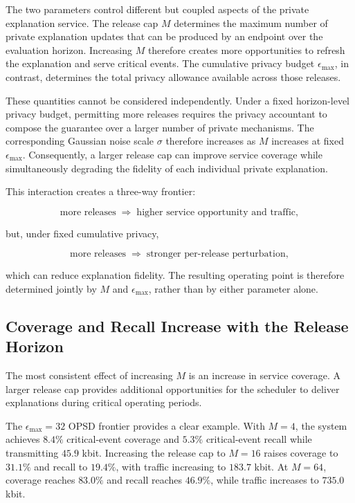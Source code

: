 \documentclass[11pt]{article}
\begin{document}
The two parameters control different but coupled aspects of the private explanation service. The release cap \(M\) determines the maximum number of private explanation updates that can be produced by an endpoint over the evaluation horizon. Increasing \(M\) therefore creates more opportunities to refresh the explanation and serve critical events. The cumulative privacy budget \(\epsilon_{\max}\), in contrast, determines the total privacy allowance available across those releases.

These quantities cannot be considered independently. Under a fixed horizon-level privacy budget, permitting more releases requires the privacy accountant to compose the guarantee over a larger number of private mechanisms. The corresponding Gaussian noise scale \(\sigma\) therefore increases as \(M\) increases at fixed \(\epsilon_{\max}\). Consequently, a larger release cap can improve service coverage while simultaneously degrading the fidelity of each individual private explanation.

This interaction creates a three-way frontier:

$$
\text{more releases}
\;\Longrightarrow\;
\text{higher service opportunity and traffic},
$$

but, under fixed cumulative privacy,

$$
\text{more releases}
\;\Longrightarrow\;
\text{stronger per-release perturbation},
$$

which can reduce explanation fidelity. The resulting operating point is therefore determined jointly by \(M\) and \(\epsilon_{\max}\), rather than by either parameter alone.

\subsection{Coverage and Recall Increase with the Release Horizon}

The most consistent effect of increasing \(M\) is an increase in service coverage. A larger release cap provides additional opportunities for the scheduler to deliver explanations during critical operating periods.

The \(\epsilon_{\max}=32\) OPSD frontier provides a clear example. With \(M=4\), the system achieves \(8.4\%\) critical-event coverage and \(5.3\%\) critical-event recall while transmitting \(45.9\) kbit. Increasing the release cap to \(M=16\) raises coverage to \(31.1\%\) and recall to \(19.4\%\), with traffic increasing to \(183.7\) kbit. At \(M=64\), coverage reaches \(83.0\%\) and recall reaches \(46.9\%\), while traffic increases to \(735.0\) kbit.
\end{document}
